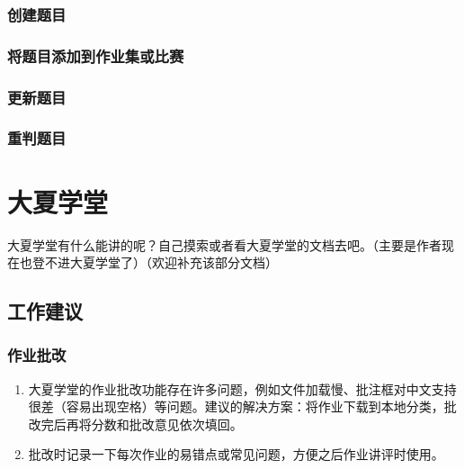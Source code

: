 \documentclass[oneside]{book}
\begin{document}
\subsection{创建题目}

\label{ssec:create_new}

\subsection{将题目添加到作业集或比赛}

\label{ssec:add_problem_to_homework_set}

\subsection{更新题目}

\label{ssec:update_problem}

\subsection{重判题目}

\label{ssec:rejudge_problem}

\chapter{大夏学堂}

\label{chap:elearning}


大夏学堂有什么能讲的呢？自己摸索或者看大夏学堂的文档去吧。（主要是作者现在也登不进大夏学堂了）（欢迎补充该部分文档）

\section{工作建议}

\subsection{作业批改}

\begin{enumerate}
  \item 大夏学堂的作业批改功能存在许多问题，例如文件加载慢、批注框对中文支持很差（容易出现空格）等问题。建议的解决方案：将作业下载到本地分类，批改完后再将分数和批改意见依次填回。
  \item 批改时记录一下每次作业的易错点或常见问题，方便之后作业讲评时使用。
\end{enumerate}
\end{document}
